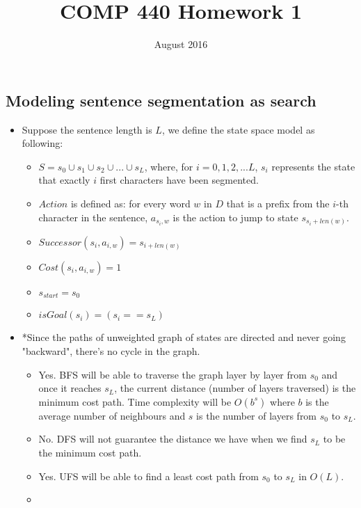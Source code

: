 \documentclass[11pt]{article}
\title{COMP 440 Homework 1}
\date{August 2016}
\begin{document}
\begin{onehalfspace}
    \maketitle
    \newpage{}
    \section{Modeling sentence segmentation as search}
    \begin{itemize}
        \item
        Suppose the sentence length is $L$, we define the state space model as following:
        \begin{itemize}
            \item
            $S = s_0\cup s_1\cup s_2\cup ... \cup s_L$, where, for $i = 0, 1, 2, ... L$, $s_i$ represents the state that exactly $i$ first characters have been segmented.
            \item
            $Action$ is defined as: for every word $w$ in $D$ that is a prefix from the $i$-th character in the sentence, $a_{s_i,w}$ is the action to jump to state $s_{s_i+len(w)}$.
            \item
            $Successor(s_i, a_{i,w}) = s_{i+len(w)}$
            \item
            $Cost(s_i, a_{i,w}) = 1$
            \item
            $s_{start} = s_0$
            \item
            $isGoal(s_i) = (s_i == s_L)$
        \end{itemize}
        \item
        *Since the paths of unweighted graph of states are directed and never going "backward", there's no cycle in the graph.
        \begin{itemize}
            \item
            Yes. BFS will be able to traverse the graph layer by layer from $s_0$ and once it reaches $s_L$, the current distance (number of layers traversed) is the minimum cost path. Time complexity will be $O(b^s)$ where $b$ is the average number of neighbours and $s$ is the number of layers from $s_0$ to $s_L$.
            \item
            No. DFS will not guarantee the distance we have when we find $s_L$ to be the minimum cost path.
            \item
            Yes. UFS will be able to find a least cost path from $s_0$ to $s_L$ in $O(L)$.
            \item

\end{itemize}
\end{itemize}
\end{onehalfspace}
\end{document}
